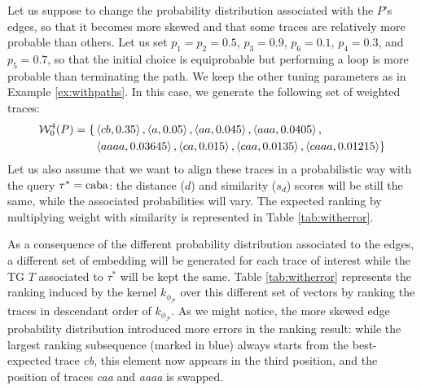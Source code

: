 \begin{example}\label{ex:moreskew}
	Let us suppose to change the probability distribution associated with the $P$'s edges, so that it becomes more skewed and that some traces are relatively more probable than others. Let us set $p_1=p_2=0.5$, $p_3=0.9$, $p_6=0.1$, $p_4=0.3$, and $p_5=0.7$, so that the initial choice is equiprobable but performing a loop is more probable than terminating the path. We keep the other tuning parameters as in Example \ref{ex:withpaths}. In this case, we generate the following set of weighted traces:
	$$\begin{aligned}
	\mathcal{W}_0^4(P)=\{&\braket{cb,0.35},\braket{a,0.05},\braket{aa,0.045},\braket{aaa,0.0405},\\
	&\braket{aaaa,0.03645},\braket{ca,0.015},\braket{caa,0.0135},\braket{caaa,0.01215}\}\\
	\end{aligned}$$
	Let us also assume that we want to align these traces in a probabilistic way with the query $\tau^*=\textup{caba}$: the distance ($d$) and similarity ($s_d$) scores will be still the same, while the associated probabilities will vary. The expected ranking by multiplying weight with similarity is represented in Table \ref{tab:witherror}.
	
	As a consequence of the different probability distribution associated to the edges, a different set of embedding will be generated for each trace of interest while the TG $T$ associated to $\tau^*$ will be kept the same. Table \ref{tab:witherror} represents the ranking induced by the kernel $k_{\phi_{\mathcal{P}}}$ over this different set of vectors by ranking the traces in descendant order of $k_{\phi_{\mathcal{P}}}$. As we might notice, the more skewed edge probability distribution introduced more errors in the ranking result: while the largest ranking subsequence (marked in blue) always starts from the best-expected trace \textit{cb}, this element now appears in the third position, and the position of traces \textit{caa} and \textit{aaaa} is swapped.
	
\end{example}
